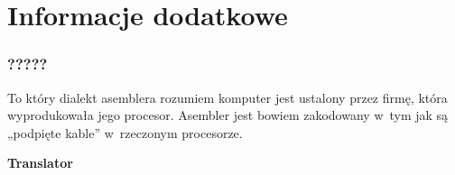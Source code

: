 \documentclass[10pt,t]{beamer}
\begin{document}






































\section{Informacje dodatkowe}









\begin{frame}
  \frametitle{?????}


  To który dialekt asemblera rozumiem komputer jest ustalony przez firmę,
  która wyprodukowała jego procesor. Asembler jest bowiem zakodowany w~tym
  jak są „podpięte kable” w~rzeczonym procesorze.


\textbf{Translator}

\end{frame}











\end{document}
